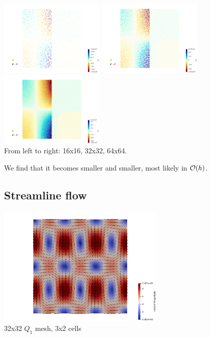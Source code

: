\begin{center}
\includegraphics[width=5cm]{python_codes/fieldstone_30/results_solcx/C0_16}
\includegraphics[width=5cm]{python_codes/fieldstone_30/results_solcx/C0_32}
\includegraphics[width=5cm]{python_codes/fieldstone_30/results_solcx/C0_64}\\
{\captionfont From left to right: 16x16, 32x32, 64x64.} 
\end{center}
We find that it becomes smaller and smaller, most likely in ${\cal O}(h)$.


\newpage
\subsection*{Streamline flow}


\begin{center}
\includegraphics[width=8cm]{python_codes/fieldstone_30/results_streamline/vel}\\
{\captionfont 32x32 $Q_1$ mesh, 3x2 cells}
\end{center}

